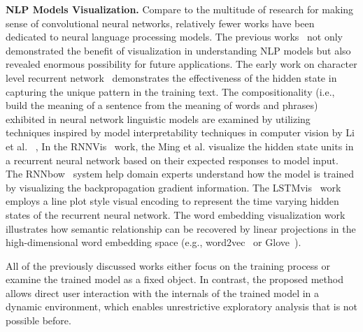 \textbf{NLP Models Visualization.}
Compare to the multitude of research for making sense of convolutional neural networks, relatively fewer works have been dedicated to neural language processing models.
%
The previous works~\cite{KarpathyJohnson2015, LiChenHovy2015, StrobeltGehrmannPfister2018, LiuBremerJayaraman2018} not only demonstrated the benefit of visualization in understanding NLP models but also revealed enormous possibility for future applications.
The early work on character level recurrent network~\cite{KarpathyJohnson2015} demonstrates the effectiveness of the hidden state in capturing the unique pattern in the training text. The compositionality (i.e., build the meaning of a sentence from the meaning of words and phrases) exhibited in neural network linguistic models are examined by utilizing techniques inspired by model interpretability techniques in computer vision by Li et al. ~\cite{LiChenHovy2015}, 
In the RNNVis~\cite{MingCaoZhang2017} work, the Ming et al. visualize the hidden state units in a recurrent neural network based on their expected responses to model input.
The RNNbow~\cite{CashmanPattersonMosca2017} system help domain experts understand how the model is trained by visualizing the backpropagation gradient information.
The LSTMvis~\cite{StrobeltGehrmannPfister2018} work employs a line plot style visual encoding to represent the time varying hidden states of the recurrent neural network. The word embedding visualization work~\cite{LiuBremerJayaraman2018} illustrates how semantic relationship can be recovered by linear projections in the high-dimensional word embedding space (e.g., word2vec~\cite{MikolovSutskeverChen2013} or Glove~\cite{PenningtonSocherManning2014}).

All of the previously discussed works either focus on the training process or examine the trained model as a fixed object. In contrast, the proposed method allows direct user interaction with the internals of the trained model in a dynamic environment, which enables unrestrictive exploratory analysis that is not possible before.
